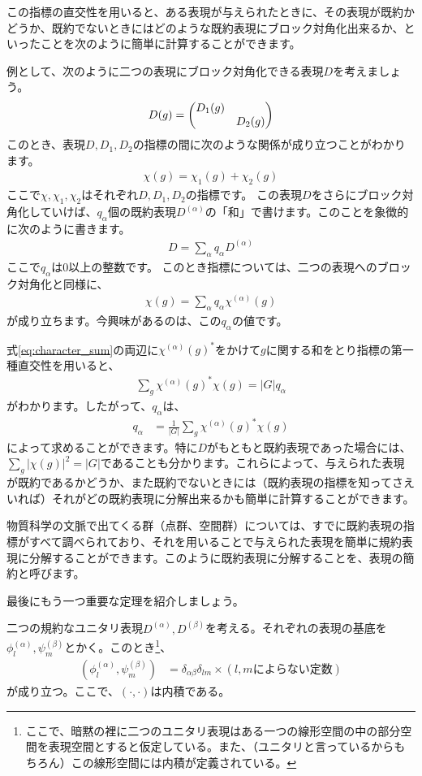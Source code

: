 \documentclass[uplatex,dvipdfmx,a4j]{jsarticle}
\begin{document}
この指標の直交性を用いると、ある表現が与えられたときに、その表現が既約かどうか、既約でないときにはどのような既約表現にブロック対角化出来るか、といったことを次のように簡単に計算することができます。

例として、次のように二つの表現にブロック対角化できる表現$D$を考えましょう。
\begin{align}
	D(g) = \mqty(\dmat{D_1(g), D_2(g)})
\end{align}
このとき、表現$D, D_1, D_2$の指標の間に次のような関係が成り立つことがわかります。
\begin{align}
	\chi(g) = \chi_1(g) + \chi_2(g)
\end{align}
ここで$\chi, \chi_1, \chi_2$はそれぞれ$D, D_1, D_2$の指標です。
この表現$D$をさらにブロック対角化していけば、$q_\alpha$個の既約表現$D^{(\alpha)}$の「和」で書けます。このことを象徴的に次のように書きます。
\begin{align}
	D = \sum_\alpha q_\alpha D^{(\alpha)}
\end{align}
ここで$q_\alpha$は0以上の整数です。
このとき指標については、二つの表現へのブロック対角化と同様に、
\begin{align}
	\chi(g) = \sum_\alpha q_\alpha \chi^{(\alpha)}(g) \label{eq:character_sum}
\end{align}
が成り立ちます。今興味があるのは、この$q_\alpha$の値です。

式\eqref{eq:character_sum}の両辺に$\chi^{(\alpha)}(g)^*$をかけて$g$に関する和をとり指標の第一種直交性を用いると、
\begin{align}
	\sum_g \chi^{(\alpha)}(g)^* \chi(g) = |G|q_\alpha
\end{align}
がわかります。したがって、$q_\alpha$は、
\begin{align}
	q_\alpha &= \frac{1}{|G|}\sum_g \chi^{(\alpha)}(g)^* \chi(g) \label{eq:decompose_character}
\end{align}
によって求めることができます。特に$D$がもともと既約表現であった場合には、$\sum_g |\chi(g)|^2 = |G|$であることも分かります。これらによって、与えられた表現が既約であるかどうか、また既約でないときには（既約表現の指標を知ってさえいれば）それがどの既約表現に分解出来るかも簡単に計算することができます。

物質科学の文脈で出てくる群（点群、空間群）については、すでに既約表現の指標がすべて調べられており、それを用いることで与えられた表現を簡単に規約表現に分解することができます。このように既約表現に分解することを、表現の簡約と呼びます。

最後にもう一つ重要な定理を紹介しましょう。
\begin{tcolorbox}[title=既約表現における基底の直交性]
	二つの規約なユニタリ表現$D^{(\alpha)}, D^{(\beta)}$を考える。それぞれの表現の基底を$\phi^(\alpha)_l, \psi^(\beta)_m$とかく。このとき\footnote{ここで、暗黙の裡に二つのユニタリ表現はある一つの線形空間の中の部分空間を表現空間とすると仮定している。また、（ユニタリと言っているからもちろん）この線形空間には内積が定義されている。}、
	\begin{align}
		(\phi^{(\alpha)}_l, \psi^{(\beta)}_m) &= \delta_{\alpha\beta} \delta_{lm}\times(l, mによらない定数) \label{eq:ortho_basis}
	\end{align}
	が成り立つ。ここで、$(\cdot, \cdot)$は内積である。
\end{tcolorbox}
\end{document}
